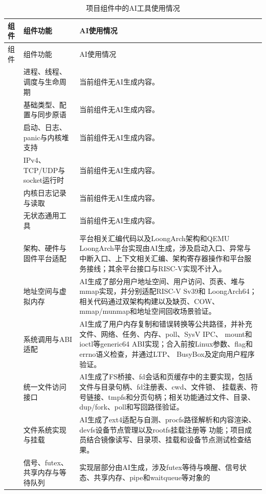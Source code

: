 \begin{longtable}{L{2.8cm}L{2.3cm}L{9.1cm}}
  \caption{项目组件中的AI工具使用情况}\label{tab:ai-usage-by-module}\\
  \toprule
  组件 & 组件功能 & AI使用情况 \\
  \midrule
  \endfirsthead
  \toprule
  组件 & 组件功能 & AI使用情况 \\
  \midrule
  \endhead
   & 进程、线程、调度与生命周期 &
  当前组件无AI生成内容。\\
   & 基础类型、配置与同步原语 &
  当前组件无AI生成内容。\\
   & 启动、日志、panic与内核堆支持 &
  当前组件无AI生成内容。\\
   & IPv4、TCP/UDP与socket运行时 &
  当前组件无AI生成内容。\\
   & 内核日志记录与读取 &
  当前组件无AI生成内容。\\
   & 无状态通用工具 &
  当前组件无AI生成内容。\\
   & 架构、硬件与固件平台适配 &
  平台相关汇编代码以及LoongArch架构和QEMU LoongArch平台实现由AI生成，涉及启动入口、异常与
  中断入口、上下文相关汇编、架构寄存器操作和平台服务接线；其余平台接口与RISC-V实现不计入。\\
   & 地址空间与虚拟内存 &
  AI生成了部分用户地址空间、用户访问、页表、堆与mmap实现，并分别适配RISC-V Sv39和
  LoongArch64；相关代码通过双架构构建以及缺页、COW、mmap/munmap和地址空间回收场景验证。\\
   & 系统调用与ABI适配 &
  AI生成了用户内存复制和错误转换等公共路径，并补充文件、网络、任务、内存、poll、SysV IPC、
  mount和ioctl等generic64 ABI实现；合入前按Linux参数、flag和errno语义检查，并通过LTP、
  BusyBox及定向用户程序验证。\\
   & 统一文件访问接口 &
  AI生成了FS桥接、fd会话和页缓存中的主要实现，包括文件与目录句柄、fd注册表、cwd、文件锁、
  挂载表、符号链接、tmpfs和分页句柄；相关功能通过文件、目录、dup/fork、poll和写回路径验证。\\
   & 文件系统实现与挂载 &
  AI生成了ext4适配与自测、procfs路径解析和内容渲染、devfs设备节点管理以及rootfs挂载注册等
  功能；项目成员结合镜像读写、目录项、挂载和设备节点测试检查结果。\\
   & 信号、futex、共享内存与等待队列 &
  实现层部分由AI生成，涉及futex等待与唤醒、信号状态、共享内存、pipe和waitqueue等对象的

\end{longtable}

